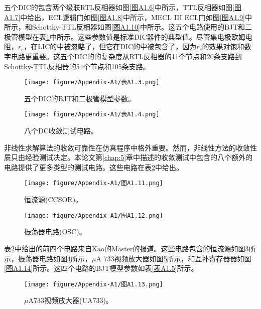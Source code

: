 五个DIC的包含两个级联RTL反相器如图\ref{图A1.6}中所示，TTL反相器如图\ref{图A1.7}中给出，ECL逻辑门如图\ref{图A1.8}中所示，MECL III ECL门如图\ref{图A1.9}中所示，和Schottky-TTL反相器如图\ref{图A1.10}中所示。这五个电路使用的BJT和二极管模型在表\ref{表A1.3}中所示。这些参数值是标准DIC器件的典型值。尽管集电极欧姆电阻，$r_c$，在LIC的中被忽略了，但它在DIC的中被包含了，因为$r_c$的效果对饱和数字电路更重要。这五个DIC的的复杂度从RTL反相器的11个节点和20条支路到Schottky-TTL反相器的54个节点和105条支路。

\begin{figure}[htbp]
\small
    \centering
    \texttt{[image: figure/Appendix-A1/表A1.3.png]}
    \caption{五个DIC的BJT和二极管模型参数。}
    \label{表A1.3}
\end{figure}

\begin{figure}[htbp]
\small
    \centering
    \texttt{[image: figure/Appendix-A1/表A1.4.png]}
    \caption{八个DC收敛测试电路。}
    \label{表A1.4}
\end{figure}

非线性求解算法的收敛可靠性在仿真程序中格外重要。然而，非线性方法的收敛性质只由经验测试决定。本论文第\ref{chap:5}章中描述的收敛测试中包含的八个额外的电路提供了更多类型的测试电路。这些电路在表\ref{表A1.4}中给出。

\begin{figure}[htbp]
\small
    \centering
    \texttt{[image: figure/Appendix-A1/图A1.11.png]}
    \caption{恒流源(CCSOR)。}
    \label{图A1.11}
\end{figure}

\begin{figure}[htbp]
\small
    \centering
    \texttt{[image: figure/Appendix-A1/图A1.12.png]}
    \caption{振荡器电路(OSC)。}
    \label{图A1.12}
\end{figure}

表\ref{表A1.4}中给出的前四个电路来自Kao\cite{ref-58}的Master的报道。这些电路包含的恒流源如图\ref{图A1.11}所示，振荡器电路如图\ref{图A1.12}所示，$\mu$A 733视频放大器如图\ref{图A1.13}所示，和互补寄存器器如图\ref{图A1.14}所示。这四个电路的BJT模型参数如表\ref{表A1.5}所示。

\begin{figure}[htbp]
\small
    \centering
    \texttt{[image: figure/Appendix-A1/图A1.13.png]}
    \caption{$\mu$A733视频放大器(UA733)。}
    \label{图A1.13}
\end{figure}

